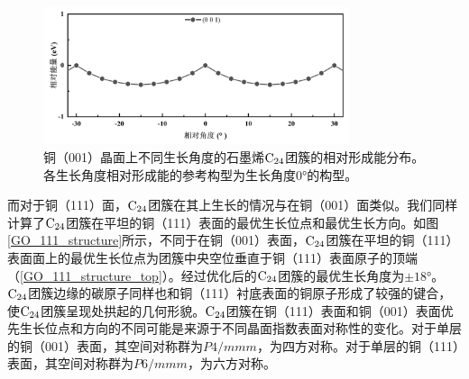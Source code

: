         \begin{figure}[htbp]
            \includegraphics[width=0.8\textwidth]{pic/GO_C24_flat_001_energy.png}
            
            \caption{铜（001）晶面上不同生长角度的石墨烯$\rm{C_{24}}$团簇的相对形成能分布。各生长角度相对形成能的参考构型为生长角度0\si{\degree}的构型。}
            
            \label{GO_001_energy}
        \end{figure}

        而对于铜（111）面，$\rm{C_{24}}$团簇在其上生长的情况与在铜（001）面类似。我们同样计算了$\rm{C_{24}}$团簇在平坦的铜（111）表面的最优生长位点和最优生长方向。如图\ref{GO_111_structure}所示，不同于在铜（001）表面，$\rm{C_{24}}$团簇在平坦的铜（111）表面面上的最优生长位点为团簇中央空位垂直于铜（111）表面原子的顶端（\ref{GO_111_structure_top}）。经过优化后的$\rm{C_{24}}$团簇的最优生长角度为$\pm 18\si{\degree}$。$\rm{C_{24}}$团簇边缘的碳原子同样也和铜（111）衬底表面的铜原子形成了较强的键合，使$\rm{C_{24}}$团簇呈现处拱起的几何形貌。$\rm{C_{24}}$团簇在铜（111）表面和铜（001）表面优先生长位点和方向的不同可能是来源于不同晶面指数表面对称性的变化。对于单层的铜（001）表面，其空间对称群为$P4/mmm$，为四方对称。对于单层的铜（111）表面，其空间对称群为$P6/mmm$，为六方对称。

